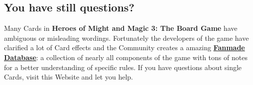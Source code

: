 \begin{multicols*}{2}
\subsection*{You have still questions?}
Many Cards in \textbf{Heroes of Might and Magic 3: The Board Game} have ambiguous or misleading wordings. Fortunately the developers of the game have clarified a lot of Card effects and the Community creates a amazing \href{https://homm3bg.wiki/}{\textbf{Fanmade Database}}: a collection of nearly all components of the game with tons of notes for a better understanding of specific rules. If you have questions about single Cards, visit this Website and let you help.

\end{multicols*}
